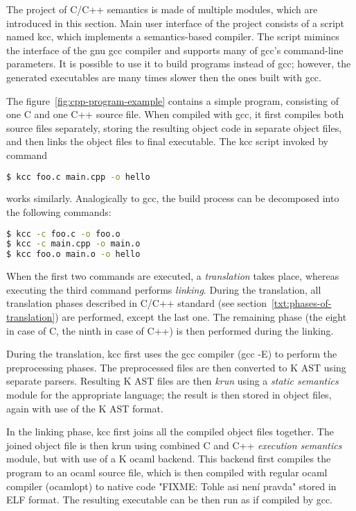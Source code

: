 \documentclass{fithesis3}
\begin{document}
The project of C/C++ semantics is made of multiple modules, which are introduced in this section. 
Main user interface of the project consists of a script named kcc, which implements a semantics-based compiler. The script mimincs the interface of the gnu gcc compiler and supports many of gcc's command-line parameters. It is possible to use it to build programs instead of gcc; however, the generated executables are many times slower then the ones built with gcc.

The figure~\ref{fig:cpp-program-example} contains a simple program, consisting of one C and one C++ source file. When compiled with gcc, it first compiles both source files separately, storing the resulting object code in separate object files, and then links the object files to final executable. The kcc script invoked by command
\begin{lstlisting}[language=bash]
$ kcc foo.c main.cpp -o hello
\end{lstlisting}
works similarly. Analogically to gcc, the build process can be decomposed into the following commands:
\begin{lstlisting}[language=bash]
$ kcc -c foo.c -o foo.o
$ kcc -c main.cpp -o main.o
$ kcc foo.o main.o -o hello
\end{lstlisting}

When the first two commands are executed, a \textit{translation} takes place, whereas executing the third command performs \textit{linking}. During the translation, all translation phases described in C/C++ standard (see section~\ref{txt:phases-of-translation}) are performed, except the last one. The remaining phase (the eight in case of C, the ninth in case of C++) is then performed during the linking.

During the translation, kcc first uses the gcc compiler (gcc -E) to perform the preprocessing phases. The preprocessed files are then converted to K AST using separate parsers. Resulting K AST files are then \textit{krun} using a \textit{static semantics} module for the appropriate language; the result is then stored in object files, again with use of the K AST format.

In the linking phase, kcc first joins all the compiled object files together. The joined object file is then krun using combined C and C++ \textit{execution semantics} module, but with use of a K ocaml backend. This backend first compiles the program to an ocaml source file, which is then compiled with regular ocaml compiler (ocamlopt) to native code "FIXME: Tohle asi není pravda" stored in ELF format. The resulting executable can be then run as if compiled by gcc.
\end{document}

